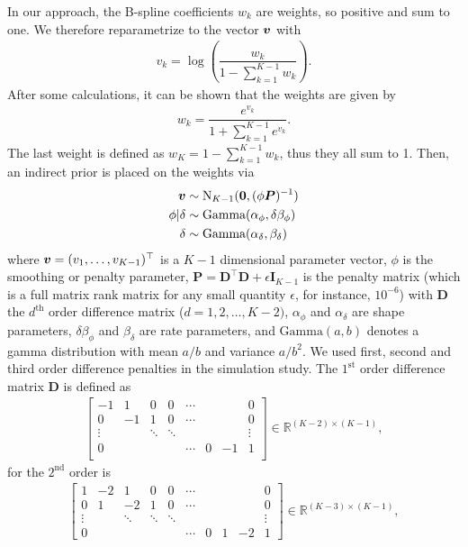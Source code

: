 \documentclass[twocolumn,final]{svjour3}
\newcommand{\bm}[1]{\mbox{\boldmath $#1$}}
\begin{document}
In our approach, the B-spline coefficients $w_k$ are weights, so positive and sum to one. 
We therefore reparametrize to the vector $\bm{v}$ with
\begin{align*}
v_k = \log \left( \dfrac{w_k}{1-\sum_{k=1}^{K-1}w_k} \right).
\end{align*}
After some calculations, it can be shown that the weights are given by
\begin{align*}
w_k = \dfrac{e^{v_k}}{1+ \sum^{K-1}_{k=1}e^{v_k}}.
\end{align*}
The last weight is defined as $w_K = 1 - \sum_{k=1}^{K-1}w_k$, thus they all sum to 1.
Then, an indirect prior is placed on the weights via
\begin{align*}
\bm{v}&\sim\text{N}_{K-1}(\bm{0}, (\phi \bm{P})^{-1})\\
\phi|\delta &\sim \text{Gamma}(\alpha_{\phi}, \delta \beta_{\phi})\\
\delta &\sim \text{Gamma}(\alpha_{\delta}, \beta_{\delta})
\end{align*}
where $\bm{v} = (v_1,\dots,v_{K-1})^\top$ is a $K-1$ dimensional parameter vector, $\phi$ is the smoothing or penalty parameter, $\textbf{P} = \textbf{D}^\top \textbf{D} +\epsilon \textbf{I}_{K-1}$ is the penalty matrix (which is a full matrix rank matrix for any small quantity $\epsilon$, for instance, $10^{-6}$) with $\textbf{D}$ the $d^{\text{th}}$ order difference matrix ($d=1,2,\ldots, K-2)$, $\alpha_{\phi}$ and $\alpha_{\delta}$ are shape parameters, $\delta \beta_{\phi}$ and $\beta_{\delta}$ are rate parameters, and $\text{Gamma}(a,b)$ denotes a gamma distribution with mean $a/b$ and variance $a/b^2$.
We used first, second and third order difference penalties in the simulation study.
The $1^{\text{st}}$ order difference matrix \textbf{D} is defined as
\begin{align*}
\begin{bmatrix}
-1 & 1   & 0  & 0 & \cdots & & & 0 \\
0  &  -1 & 1  & 0 & \cdots & & & 0 \\
\vdots  &    & \ddots & \ddots   & &&& \vdots \\   
0 &    &    &   & \cdots & 0 &  -1 & 1 \\
\end{bmatrix}
\in \mathbb{R}^{(K-2)\times (K-1)},
\end{align*}
for the $2^{\text{nd}}$ order is
\begin{align*}
\begin{bmatrix}
1 & -2 &  1 & 0 & 0 & \cdots & & & & 0 \\
0 & 1  & -2 & 1 & 0 & \cdots & & & & 0 \\
\vdots & & \ddots & \ddots & \ddots &&&&& \vdots \\
0 & &&&& \cdots & 0 & 1 & -2 & 1 
\end{bmatrix}
\in \mathbb{R}^{(K-3)\times (K-1)},
\end{align*}
\end{document}
